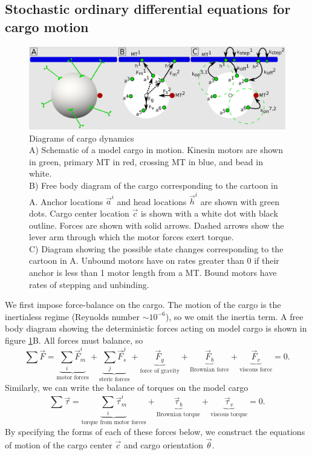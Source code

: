 \subsection{Stochastic ordinary differential equations for cargo motion}

\begin{figure}
\centering
\includegraphics[width=6.5in]{appendix1/diagrams.eps}
\caption[Diagrams of simulated cargo dynamics]{Diagrams of cargo dynamics \\
A) Schematic of a model cargo in motion. Kinesin motors are shown in green, primary MT in red, crossing MT in blue, and bead in white. \\
B) Free body diagram of the cargo corresponding to the cartoon in A. Anchor locations $\vec{a}^i$ and head locations $\vec{h}^i$ are shown with green dots. Cargo center location $\vec{c}$ is shown with a white dot with black outline. Forces are shown with solid arrows. Dashed arrows show the lever arm through which the motor forces exert torque. \\
C) Diagram showing the possible state changes corresponding to the cartoon in A. Unbound motors have on rates greater than 0 if their anchor is less than 1 motor length from a MT. Bound motors have rates of stepping and unbinding.
} \label{fig:FBD}
\end{figure}

We first impose force-balance on the cargo. The motion of the cargo is the inertialess regime (Reynolds number $\sim 10^{-6}$), so we omit the inertia term. A free body diagram showing the deterministic forces acting on model cargo is shown in figure \ref{fig:FBD}B. All forces must balance, so
\begin{equation} \label{eq:forcebalance}
\sum \vec{F} = \underbrace{\sum_i \vec{F}_m^i}_{\text{motor forces}} + \underbrace{\sum_j \vec{F}_s^j}_{\text{steric forces}} + \underbrace{\vec{F}_g}_{\text{force of gravity}} + \underbrace{\vec{F}_b}_{\text{Brownian force}} + \underbrace{\vec{F}_v}_{\text{viscous force}} = 0.
\end{equation}
Similarly, we can write the balance of torques on the model cargo
\begin{equation} \label{eq:torquebalance}
\sum \vec{\tau} = \underbrace{\sum_i \vec{\tau}_m^i}_{\text{torque from motor forces}} +\underbrace{\vec{\tau}_b}_{\text{Brownian torque}} + \underbrace{\vec{\tau}_v}_{\text{viscous torque}} = 0.
\end{equation}
By specifying the forms of each of these forces below, we construct the equations of motion of the cargo center $\vec{c}$ and cargo orientation $\vec{\theta}$.

